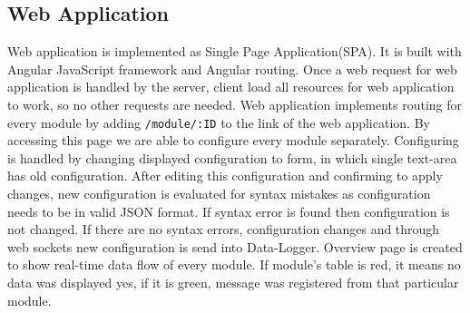 \subsection{Web Application} %
\label{sub:web_application}
Web application is implemented as Single Page Application(SPA). It is built with Angular JavaScript framework and Angular routing. Once a web request for web application is handled by the server, client load all resources for web application to work, so no other requests are needed. Web application implements routing for every module by adding \verb|/module/:ID| to the link of the web application. By accessing this page we are able to configure every module separately. Configuring is handled by changing displayed configuration to form, in which single text-area has old configuration. After editing this configuration and confirming to apply changes, new configuration is evaluated for syntax mistakes as configuration needs to be in valid JSON format. If syntax error is found then configuration is not changed. If there are no syntax errors, configuration changes and through web sockets new configuration is send into Data-Logger.
Overview page is created to show real-time data flow of every module. If module's table is red, it means no data was displayed yes, if it is green, message was registered from that particular module.
